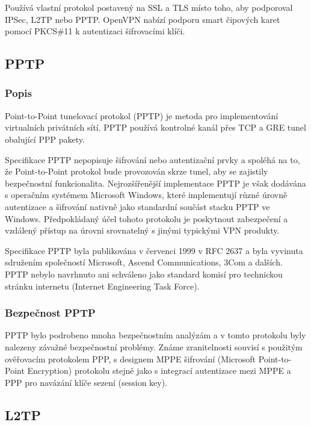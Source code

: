 \documentclass[thesis=B,czech]{FITthesis}[2012/06/26]
\begin{document}
		Používá vlastní protokol postavený na SSL a TLS místo toho, aby podporoval IPSec, L2TP nebo PPTP. OpenVPN nabízí podporu smart čipových karet pomocí PKCS\#11 k autentizaci šifrovacími klíči.
		
    \subsection{PPTP}

      \subsubsection{Popis}
       
		Point-to-Point tunelovací protokol (PPTP) je metoda pro implementování virtualních privátních sítí. PPTP používá kontrolné kanál přes TCP a GRE tunel obalující PPP pakety.

		Specifikace PPTP nepopisuje šifrování nebo autentizační prvky a spoléhá na to, že Point-to-Point protokol bude provozován skrze tunel, aby se zajistily bezpečnostní funkcionalita.
		Nejrozšířenější implementace PPTP je však dodávána s operačním systémem Microsoft Windows, které implementují různé úrovně autentizace a šifrování nativně jako standardní součást stacku PPTP ve Windows.
		Předpokládaný účel tohoto protokolu je poskytnout zabezpečení a vzdálený přístup na úrovni srovnatelný s jinými typickými VPN produkty.

		Specifikace PPTP byla publikována v červenci 1999 v RFC 2637\cite{pptp_basics} a byla vyvinuta sdružením společností Microsoft, Ascend Communications, 3Com a dalších. PPTP nebylo navrhnuto ani schváleno jako standard komisí pro technickou stránku internetu (Internet Engineering Task Force).
		
	  \subsubsection{Bezpečnost PPTP}
	  
		PPTP bylo podrobeno mnoha bezpečnostním analýzám a v tomto protokolu byly nalezeny závažné bezpečnostní problémy.
		Známe zranitelnosti souvisí s použitým ověřovacím protokolem PPP, s designem MPPE šifrování (Microsoft Point-to-Point Encryption) protokolu stejně jako s integrací autentizace mezi MPPE a PPP pro navázání klíče sezení (session key).\cite{pptp_unsec_1}\cite{pptp_unsec_2}
		
    \subsection{L2TP}
	
\end{document}
